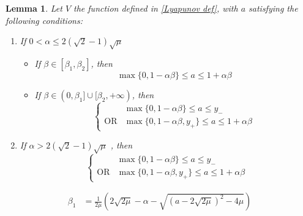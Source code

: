 \documentclass[reqno]{amsart}
\theoremstyle{plain}
\newtheorem{lemma}{Lemma}	%
\theoremstyle{definition}
\theoremstyle{remark}
\newcommand{\VM}[1]{}
\begin{document}





\begin{lemma}\label{lemma lyapunov2}
Let $V$ the function defined in \ref{Lyapunov def}, with $a$ satisfying the following conditions:
\begin{enumerate}
\item If $0<\alpha\leq 2(\sqrt{2}-1)\sqrt{\mu}$
\begin{itemize}
\item If $\beta \in [\beta_{1},\beta_{2}]$, then  
\begin{equation}\label{condition on y 1}
\max\{0,1-\alpha\beta\} \leq a \leq 1+\alpha\beta
\end{equation}
\item If $\beta\in (0,\beta_{1}]\cup[\beta_{2},+\infty)$,  then
\begin{equation}\label{condition on y 2}
\begin{cases}
&\max\{0,1-\alpha\beta\} \leq a \leq y_{-} \\
\text{OR} & \max\{0,1-\alpha\beta,y_{+}\} \leq a \leq 1+\alpha\beta
\end{cases}
\end{equation}
\end{itemize} 
\item If $\alpha>2(\sqrt{2}-1)\sqrt{\mu}$ , then 
\begin{equation}\label{condition on y 3}
\begin{cases}
&\max\{0,1-\alpha\beta\} \leq a \leq y_{-} \\
\text{OR} & \max\{0,1-\alpha\beta,y_{+}\} \leq a \leq 1+\alpha\beta
\end{cases}
\end{equation}
\end{enumerate}
\begin{align}
 \beta_{1} & = \frac{1}{2\mu}\left(2\sqrt{2\mu}-\alpha - \sqrt{(a-2\sqrt{2\mu})^{2}-4\mu}\right) \label{definition beta1} \\ 

\end{align}
\end{lemma}
\end{document}
